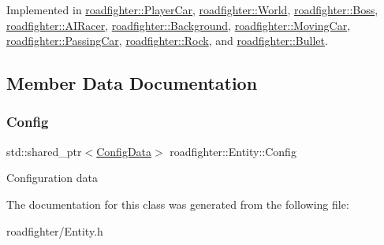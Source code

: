 Implemented in \hyperlink{classroadfighter_1_1PlayerCar_a65daed6d30d8b65f368779eaa43714e2}{roadfighter\+::\+Player\+Car}, \hyperlink{classroadfighter_1_1World_a8c26e9cb031b250cdc263623615c1891}{roadfighter\+::\+World}, \hyperlink{classroadfighter_1_1Boss_a1754fba639f122f50e3eeb55980008b2}{roadfighter\+::\+Boss}, \hyperlink{classroadfighter_1_1AIRacer_ab6156385195b3d40d44360d40aafa3a6}{roadfighter\+::\+A\+I\+Racer}, \hyperlink{classroadfighter_1_1Background_a881ed4d9e98e86ce7128c0fd18f82160}{roadfighter\+::\+Background}, \hyperlink{classroadfighter_1_1MovingCar_a62fbe61c5a1c1a1c0d376047ec1edcf2}{roadfighter\+::\+Moving\+Car}, \hyperlink{classroadfighter_1_1PassingCar_af0667cf430382117beb4669777905cc7}{roadfighter\+::\+Passing\+Car}, \hyperlink{classroadfighter_1_1Rock_af9817c01175d300ca7be67e2b5e3952e}{roadfighter\+::\+Rock}, and \hyperlink{classroadfighter_1_1Bullet_a9027c832dce3cd2839192255e0dbf301}{roadfighter\+::\+Bullet}.



\subsection{Member Data Documentation}
\mbox{\label{classroadfighter_1_1Entity_ab69d36ac1aea7450bf4f443a17af58c7}} 
\subsubsection{\texorpdfstring{Config}{Config}}
{\footnotesize\ttfamily std\+::shared\+\_\+ptr$<$\hyperlink{classConfigData}{Config\+Data}$>$ roadfighter\+::\+Entity\+::\+Config\hspace{0.3cm}{\ttfamily [protected]}}

Configuration data 

The documentation for this class was generated from the following file\+:\begin{DoxyCompactItemize}
\item 
roadfighter/Entity.\+h\end{DoxyCompactItemize}
